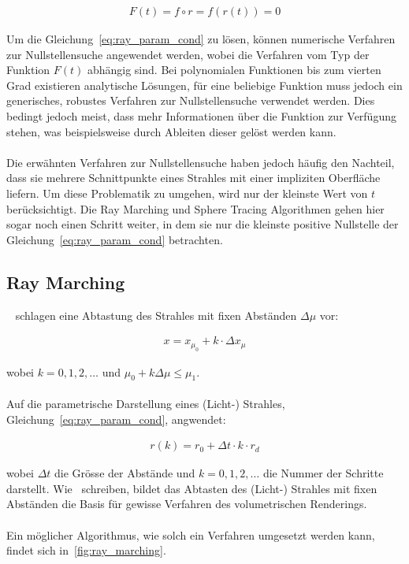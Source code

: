 \begin{gather}\label{eq:ray_param_cond}
    F(t) = f \circ r = f(r(t)) = 0
\end{gather}

Um die Gleichung~\ref{eq:ray_param_cond} zu lösen, können numerische Verfahren
zur Nullstellensuche angewendet werden, wobei die Verfahren vom Typ der
Funktion $F(t)$ abhängig sind. Bei polynomialen Funktionen bis zum vierten Grad
existieren analytische Lösungen, für eine beliebige Funktion muss jedoch ein
generisches, robustes Verfahren zur Nullstellensuche verwendet werden. Dies
bedingt jedoch meist, dass mehr Informationen über die Funktion zur Verfügung
stehen, was beispielsweise durch Ableiten dieser gelöst werden kann.\\
\\
Die erwähnten Verfahren zur Nullstellensuche haben jedoch häufig den Nachteil,
dass sie mehrere Schnittpunkte eines Strahles mit einer impliziten Oberfläche
liefern. Um diese Problematik zu umgehen, wird nur der kleinste Wert von $t$
berücksichtigt. Die Ray Marching und Sphere Tracing Algorithmen gehen hier
sogar noch einen Schritt weiter, in dem sie nur die kleinste positive
Nullstelle der Gleichung~\ref{eq:ray_param_cond} betrachten.

\subsection{Ray Marching}
\label{subsec:ray_marching}

~\cite{perlin_hypertexture_1989} schlagen eine Abtastung des Strahles mit fixen
Abständen $\Delta \mu$ vor:

\begin{gather}
    x = x_{\mu_{0}} + k \cdot \Delta x_{\mu}
\end{gather}

wobei $k = 0,1,2,\dots$ und $\mu_{0} + k \Delta \mu \leq \mu_{1}$.\\
\\
Auf die parametrische Darstellung eines (Licht-) Strahles,
Gleichung~\ref{eq:ray_param_cond}, angwendet:

\begin{gather}
    r(k) = r_{0} + \Delta t \cdot k \cdot r_{d}
\end{gather}

wobei $\Delta t$ die Grösse der Abstände und $k = 0,1,2,\dots$ die Nummer der
Schritte darstellt. Wie~\cite{hart_ray_1989} schreiben, bildet das Abtasten des
(Licht-) Strahles mit fixen Abständen die Basis für gewisse Verfahren des
volumetrischen Renderings.\\
\\
Ein möglicher Algorithmus, wie solch ein Verfahren umgesetzt werden kann,
findet sich in~\ref{fig:ray_marching}.

